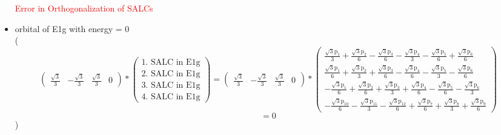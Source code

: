 \documentclass[12pt,a4paper]{article}
\begin{document}
\begin{itemize}
\textcolor{red}{Error in Orthogonalization of SALCs}\item orbital of E1g with energy = 
                                $0$ \\
( 
$$
\begin{pmatrix}\frac{\sqrt{3}}{3} & - \frac{\sqrt{3}}{3} & \frac{\sqrt{3}}{3} & 0\end{pmatrix} * \left(\begin{array}{c}\text{1. SALC in E1g} \\ \text{2. SALC in E1g} \\ \text{3. SALC in E1g} \\ \text{4. SALC in E1g}\end{array}\right) = \begin{pmatrix}\frac{\sqrt{3}}{3} & - \frac{\sqrt{3}}{3} & \frac{\sqrt{3}}{3} & 0\end{pmatrix} * \begin{pmatrix}\frac{\sqrt{3} \text{p}_{1}}{3} + \frac{\sqrt{3} \text{p}_{2}}{6} - \frac{\sqrt{3} \text{p}_{3}}{6} - \frac{\sqrt{3} \text{p}_{4}}{3} - \frac{\sqrt{3} \text{p}_{5}}{6} + \frac{\sqrt{3} \text{p}_{6}}{6}\\\frac{\sqrt{3} \text{p}_{1}}{6} + \frac{\sqrt{3} \text{p}_{2}}{3} + \frac{\sqrt{3} \text{p}_{3}}{6} - \frac{\sqrt{3} \text{p}_{4}}{6} - \frac{\sqrt{3} \text{p}_{5}}{3} - \frac{\sqrt{3} \text{p}_{6}}{6}\\- \frac{\sqrt{3} \text{p}_{1}}{6} + \frac{\sqrt{3} \text{p}_{2}}{6} + \frac{\sqrt{3} \text{p}_{3}}{3} + \frac{\sqrt{3} \text{p}_{4}}{6} - \frac{\sqrt{3} \text{p}_{5}}{6} - \frac{\sqrt{3} \text{p}_{6}}{3}\\- \frac{\sqrt{3} \text{p}_{10}}{6} - \frac{\sqrt{3} \text{p}_{11}}{3} - \frac{\sqrt{3} \text{p}_{12}}{6} + \frac{\sqrt{3} \text{p}_{7}}{6} + \frac{\sqrt{3} \text{p}_{8}}{3} + \frac{\sqrt{3} \text{p}_{9}}{6}\end{pmatrix} 
 $$ $$ = 0 
 $$ 
 )


\end{itemize}
\end{document}
